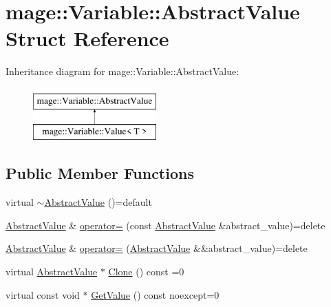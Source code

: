 \hypertarget{structmage_1_1_variable_1_1_abstract_value}{}\section{mage\+:\+:Variable\+:\+:Abstract\+Value Struct Reference}
\label{structmage_1_1_variable_1_1_abstract_value}
Inheritance diagram for mage\+:\+:Variable\+:\+:Abstract\+Value\+:\begin{figure}[H]
\begin{center}
\leavevmode
\includegraphics[height=2.000000cm]{structmage_1_1_variable_1_1_abstract_value}
\end{center}
\end{figure}
\subsection*{Public Member Functions}
\begin{DoxyCompactItemize}
\item 
virtual \hyperlink{structmage_1_1_variable_1_1_abstract_value_a7fa8fc14f81bb26f239af5f1263888a5}{$\sim$\+Abstract\+Value} ()=default
\item 
\hyperlink{structmage_1_1_variable_1_1_abstract_value}{Abstract\+Value} \& \hyperlink{structmage_1_1_variable_1_1_abstract_value_a77f7107e78716a0ea76cfaedd0a50a4b}{operator=} (const \hyperlink{structmage_1_1_variable_1_1_abstract_value}{Abstract\+Value} \&abstract\+\_\+value)=delete
\item 
\hyperlink{structmage_1_1_variable_1_1_abstract_value}{Abstract\+Value} \& \hyperlink{structmage_1_1_variable_1_1_abstract_value_a4aac7aa9278054361c478b4b8a457e6e}{operator=} (\hyperlink{structmage_1_1_variable_1_1_abstract_value}{Abstract\+Value} \&\&abstract\+\_\+value)=delete
\item 
virtual \hyperlink{structmage_1_1_variable_1_1_abstract_value}{Abstract\+Value} $\ast$ \hyperlink{structmage_1_1_variable_1_1_abstract_value_aa81140618fdb83ad33f56322a043e23f}{Clone} () const =0
\item 
virtual const void $\ast$ \hyperlink{structmage_1_1_variable_1_1_abstract_value_a857f4e519084841c3dac837771114924}{Get\+Value} () const noexcept=0
\end{DoxyCompactItemize}
